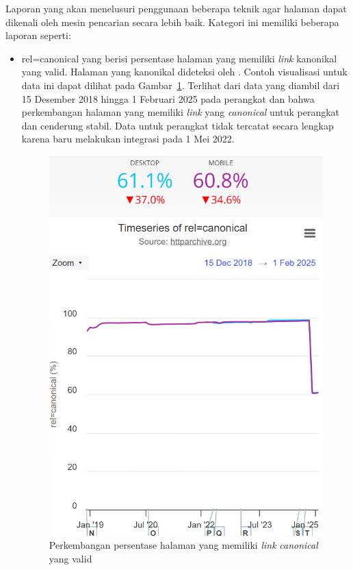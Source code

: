 Laporan yang akan menelusuri penggunaan beberapa teknik agar halaman \web dapat dikenali oleh mesin pencarian secara lebih baik. Kategori ini memiliki beberapa laporan seperti:
\begin{itemize}
    \item rel=canonical yang berisi persentase halaman yang memiliki \textit{link} kanonikal yang valid. Halaman yang kanonikal dideteksi oleh \light. Contoh visualisasi untuk data ini dapat dilihat pada Gambar~\ref{fig:canonical}. Terlihat dari data yang diambil dari 15 Desember 2018 hingga 1 Februari 2025 pada perangkat \desktop dan \mobile bahwa perkembangan halaman yang memiliki \textit{link} yang \textit{canonical} untuk perangkat \desktop dan \mobile cenderung stabil. Data untuk perangkat \desktop tidak tercatat secara lengkap karena \light baru melakukan integrasi pada 1 Mei 2022.
    \begin{figure}[H]
        \centering
        \includegraphics[width=0.4\linewidth]{Gambar/Contoh Canonical.png}
        \caption{Perkembangan persentase halaman yang memiliki \textit{link} \textit{canonical} yang valid}
        \label{fig:canonical}
    \end{figure}


\end{itemize}
